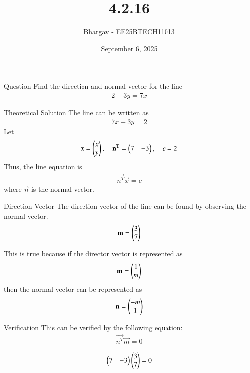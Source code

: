 \documentclass{beamer}
\title %
{4.2.16}
\date{September 6, 2025}
\author %
{Bhargav - EE25BTECH11013}
\begin{document}
\frame{\titlepage}

\begin{frame}{Question}
Find the direction and normal vector for the line 
\begin{align}
    2 + 3y = 7x
\end{align}
\end{frame}

\begin{frame}{Theoretical Solution}
The line can be written as
\begin{align}
    7x - 3y = 2
\end{align}
Let
\begin{align}
    \mathbf{x} = \begin{pmatrix}x \\ y\end{pmatrix}, \quad
    \mathbf{n^T} = \begin{pmatrix}7 & -3\end{pmatrix}, \quad
    c = 2
\end{align}
Thus, the line equation is
\begin{align}
    \vec{n^T}\vec{x} = c
\end{align}
where $\vec{n}$ is the normal vector.
\end{frame}

\begin{frame}{Direction Vector}
The direction vector of the line can be found by observing the normal vector.
\begin{align}
\mathbf{m} = \begin{pmatrix}3 \\ 7\end{pmatrix}
\end{align}


This is true because if the director vector is represented as 
\begin{align}
\mathbf{m}  = \begin{pmatrix}1 \\ m\end{pmatrix}    
\end{align}
then the normal vector can be represented as 
\begin{align}
\mathbf{n} = \begin{pmatrix}-m \\ 1\end{pmatrix}
\end{align}
\end{frame}

\begin{frame}{Verification}
This can be verified by the following equation:
\begin{align}
\vec{n^T}\vec{m} = 0
\end{align}

\begin{align}
\begin{pmatrix}7 & -3\end{pmatrix}\begin{pmatrix}3 \\ 7\end{pmatrix} = 0
\end{align}\\    
\end{frame}
\end{document}

